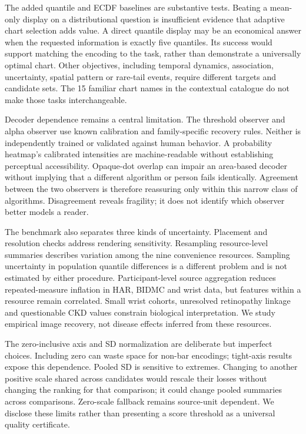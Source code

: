 \documentclass[11pt]{article}
\begin{document}
The added quantile and ECDF baselines are substantive tests. Beating a mean-only display on a distributional question is insufficient evidence that adaptive chart selection adds value. A direct quantile display may be an economical answer when the requested information is exactly five quantiles. Its success would support matching the encoding to the task, rather than demonstrate a universally optimal chart. Other objectives, including temporal dynamics, association, uncertainty, spatial pattern or rare-tail events, require different targets and candidate sets. The 15 familiar chart names in the contextual catalogue do not make those tasks interchangeable.

Decoder dependence remains a central limitation. The threshold observer and alpha observer use known calibration and family-specific recovery rules. Neither is independently trained or validated against human behavior. A probability heatmap's calibrated intensities are machine-readable without establishing perceptual accessibility.\cite{crameri2020} Opaque-dot overlap can impair an area-based decoder without implying that a different algorithm or person fails identically. Agreement between the two observers is therefore reassuring only within this narrow class of algorithms. Disagreement reveals fragility; it does not identify which observer better models a reader.

The benchmark also separates three kinds of uncertainty. Placement and resolution checks address rendering sensitivity. Resampling resource-level summaries describes variation among the nine convenience resources. Sampling uncertainty in population quantile differences is a different problem and is not estimated by either procedure. Participant-level source aggregation reduces repeated-measure inflation in HAR, BIDMC and wrist data, but features within a resource remain correlated. Small wrist cohorts, unresolved retinopathy linkage and questionable CKD values constrain biological interpretation. We study empirical image recovery, not disease effects inferred from these resources.

The zero-inclusive axis and SD normalization are deliberate but imperfect choices. Including zero can waste space for non-bar encodings; tight-axis results expose this dependence. Pooled SD is sensitive to extremes. Changing to another positive scale shared across candidates would rescale their losses without changing the ranking for that comparison; it could change pooled summaries across comparisons. Zero-scale fallback remains source-unit dependent. We disclose these limits rather than presenting a score threshold as a universal quality certificate.
\end{document}
